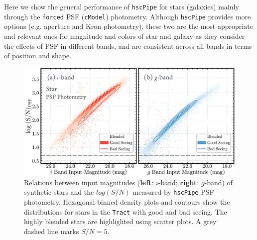 \documentclass[useamsfonts]{pasj01}
\def\hscpipe{\texttt{hscPipe}}
\def\cmodel{\texttt{cModel}}
\def\forced{\texttt{forced}}
\def\tract{\texttt{Tract}}
\begin{document}
    Here we show the general performance of \hscpipe{} for stars (galaxies)
    mainly through the \forced{} PSF (\cmodel{}) photometry.
    Although \hscpipe{} provides more options (e.g. aperture and Kron photometry),
    these two are the most appropriate and relevant ones for magnitude and colors of
    star and galaxy as they consider the effects of PSF in different bands,
    and are consistent across all bands in terms of position and shape.


\begin{figure}
    \begin{center}
        \includegraphics[width=\textwidth]{fig/synpipe_psf_sn}
    \end{center}
    \caption{
        Relations between input magnitudes (\textbf{left}: $i$-band; \textbf{right}:
        $g$-band) of synthetic stars and the $log(S/N)$ measured by \hscpipe{} PSF
        photometry.
        Hexagonal binned density plots and contours show the distributions for
        stars in the \tract{} with good and bad seeing.
        The highly blended stars are highlighted using scatter plots.
        A grey dashed line marks $S/N = 5$.
        }
    \label{fig:star_sn}
\end{figure}
\end{document}
